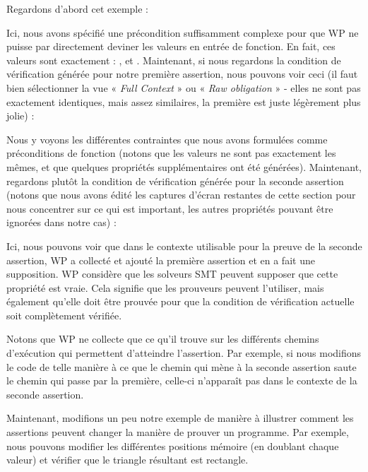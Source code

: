 


Regardons d'abord cet exemple :





Ici, nous avons spécifié une précondition suffisamment complexe pour que WP ne
puisse par directement deviner les valeurs en entrée de fonction. En fait, ces
valeurs sont exactement : ,  et
. Maintenant, si nous regardons la condition de vérification
générée pour notre première assertion, nous pouvons voir ceci (il faut bien
sélectionner la vue « \textit{Full Context} » ou « \textit{Raw obligation} » -
elles ne sont pas exactement identiques, mais assez similaires, la première est
juste légèrement plus jolie) :




Nous y voyons les différentes contraintes que nous avons formulées comme préconditions
de fonction (notons que les valeurs ne sont pas exactement les mêmes, et que quelques
propriétés supplémentaires ont été générées). Maintenant, regardons plutôt
la condition de vérification générée pour la seconde assertion (notons que nous avons
édité les captures d'écran restantes de cette section pour nous concentrer sur ce
qui est important, les autres propriétés pouvant être ignorées dans notre cas) :




Ici, nous pouvons voir que dans le contexte utilisable pour la preuve de la seconde
assertion, WP a collecté et ajouté la première assertion et en a fait une supposition.
WP considère que les solveurs SMT peuvent supposer que cette propriété est vraie.
Cela signifie que les prouveurs peuvent l'utiliser, mais également qu'elle doit être
prouvée pour que la condition de vérification actuelle soit complètement vérifiée.


Notons que WP ne collecte que ce qu'il trouve sur les différents chemins d'exécution
qui permettent d'atteindre l'assertion. Par exemple, si nous modifions le code de
telle manière à ce que le chemin qui mène à la seconde assertion saute le chemin qui
passe par la première, celle-ci n'apparaît pas dans le contexte de la seconde assertion.






Maintenant, modifions un peu notre exemple de manière à illustrer comment les
assertions peuvent changer la manière de prouver un programme. Par exemple, nous
pouvons modifier les différentes positions mémoire (en doublant chaque valeur) et
vérifier que le triangle résultant est rectangle.



